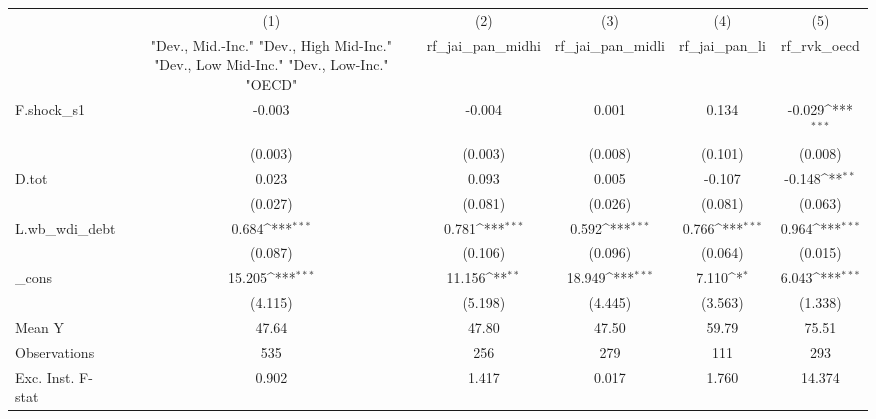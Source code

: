 {
\def\sym#1{\ifmmode^{#1}\else\(^{#1}\)\fi}
\begin{tabular}{l*{5}{c}}
\toprule
            &\multicolumn{1}{c}{(1)}&\multicolumn{1}{c}{(2)}&\multicolumn{1}{c}{(3)}&\multicolumn{1}{c}{(4)}&\multicolumn{1}{c}{(5)}\\
            &\multicolumn{1}{c}{ "Dev., Mid.-Inc." "Dev., High Mid-Inc." "Dev., Low Mid-Inc." "Dev., Low-Inc." "OECD" }&\multicolumn{1}{c}{rf\_jai\_pan\_midhi}&\multicolumn{1}{c}{rf\_jai\_pan\_midli}&\multicolumn{1}{c}{rf\_jai\_pan\_li}&\multicolumn{1}{c}{rf\_rvk\_oecd}\\
\midrule
F.shock\_s1  &      -0.003         &      -0.004         &       0.001         &       0.134         &      -0.029\sym{***}\\
            &     (0.003)         &     (0.003)         &     (0.008)         &     (0.101)         &     (0.008)         \\
\addlinespace
D.tot       &       0.023         &       0.093         &       0.005         &      -0.107         &      -0.148\sym{**} \\
            &     (0.027)         &     (0.081)         &     (0.026)         &     (0.081)         &     (0.063)         \\
\addlinespace
L.wb\_wdi\_debt&       0.684\sym{***}&       0.781\sym{***}&       0.592\sym{***}&       0.766\sym{***}&       0.964\sym{***}\\
            &     (0.087)         &     (0.106)         &     (0.096)         &     (0.064)         &     (0.015)         \\
\addlinespace
\_cons      &      15.205\sym{***}&      11.156\sym{**} &      18.949\sym{***}&       7.110\sym{*}  &       6.043\sym{***}\\
            &     (4.115)         &     (5.198)         &     (4.445)         &     (3.563)         &     (1.338)         \\
\midrule
Mean Y      &       47.64         &       47.80         &       47.50         &       59.79         &       75.51         \\
Observations&         535         &         256         &         279         &         111         &         293         \\
Exc. Inst. F-stat&       0.902         &       1.417         &       0.017         &       1.760         &      14.374         \\
\bottomrule
\end{tabular}
}
